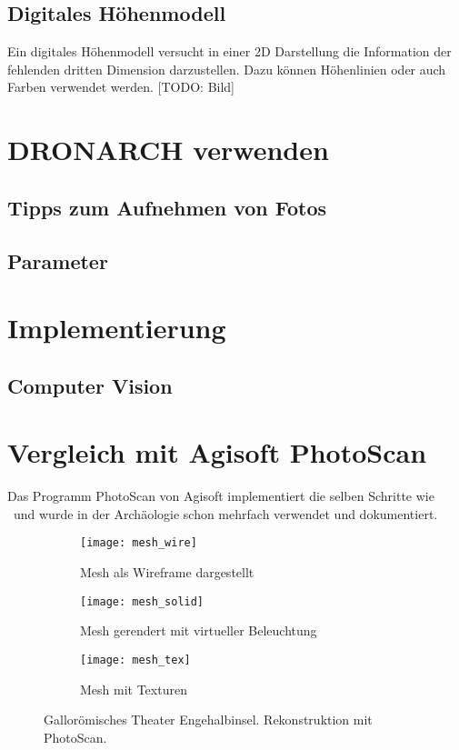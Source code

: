 		\section{Digitales Höhenmodell} \label{app:dtm}
			Ein digitales Höhenmodell versucht in einer 2D Darstellung die Information der fehlenden dritten Dimension darzustellen. Dazu können Höhenlinien oder auch Farben verwendet werden.
			[TODO: Bild]
			
\chapter{DRONARCH verwenden}
	\section{Tipps zum Aufnehmen von Fotos}\label{app:tip_foto}
	\section{Parameter}\label{app:param}
	
\chapter{Implementierung} \label{app:imp}
	\section{Computer Vision} \label{app:imp:comp_vis}
	
\chapter{Vergleich mit Agisoft PhotoScan}\label{app:photoscan}
	Das Programm PhotoScan von Agisoft implementiert die selben Schritte wie \dronarch\ und wurde in der Archäologie schon mehrfach verwendet und dokumentiert.
	
	\begin{figure}
		\vspace*{-4.5cm}
		\begin{subfigure}{\textwidth}
			\texttt{[image: mesh\_wire]}
			\label{app:agi_wire}
			\caption{Mesh als Wireframe dargestellt}
		\end{subfigure}
		\begin{subfigure}{\textwidth}
			\texttt{[image: mesh\_solid]}
			\label{app:agi_solid}
			\caption{Mesh gerendert mit virtueller Beleuchtung}
		\end{subfigure}
		\begin{subfigure}{\textwidth}
			\texttt{[image: mesh\_tex]}
			\label{app:agi_tex}
			\caption{Mesh mit Texturen}
		\end{subfigure}
		\caption{Gallorömisches Theater Engehalbinsel. Rekonstruktion mit PhotoScan.}
		\label{app:mesh}
	\end{figure}
	